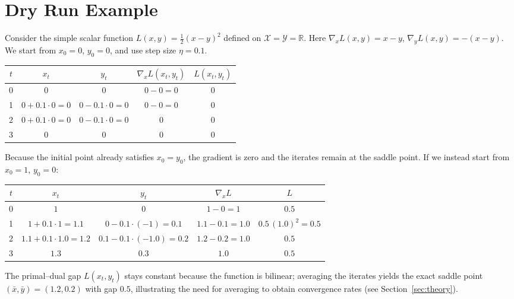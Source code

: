 \documentclass{article}
\begin{document}
\section*{Dry Run Example}
Consider the simple scalar function $L(x,y)=\tfrac12 (x-y)^{2}$ defined on $\mathcal{X}=\mathcal{Y}=\mathbb{R}$.  
Here $\nabla_{x}L(x,y)=x-y$, $\nabla_{y}L(x,y)=-(x-y)$.  
We start from $x_{0}=0$, $y_{0}=0$, and use step size $\eta=0.1$.

\begin{center}
\begin{tabular}{c|c|c|c|c}
$t$ & $x_{t}$ & $y_{t}$ & $\nabla_{x}L(x_{t},y_{t})$ & $L(x_{t},y_{t})$\\\hline
0 & $0$ & $0$ & $0-0=0$ & $0$\\
1 & $0+0.1\cdot0=0$ & $0-0.1\cdot0=0$ & $0-0=0$ & $0$\\
2 & $0+0.1\cdot0=0$ & $0-0.1\cdot0=0$ & $0$ & $0$\\
3 & $0$ & $0$ & $0$ & $0$
\end{tabular}
\end{center}
Because the initial point already satisfies $x_{0}=y_{0}$, the gradient is zero and the iterates remain at the saddle point.  
If we instead start from $x_{0}=1$, $y_{0}=0$:

\begin{center}
\begin{tabular}{c|c|c|c|c}
$t$ & $x_{t}$ & $y_{t}$ & $\nabla_{x}L$ & $L$ \\ \hline
0 & $1$ & $0$ & $1-0=1$ & $0.5$\\
1 & $1+0.1\cdot1=1.1$ & $0-0.1\cdot(-1)=0.1$ & $1.1-0.1=1.0$ & $0.5\,(1.0)^{2}=0.5$\\
2 & $1.1+0.1\cdot1.0=1.2$ & $0.1-0.1\cdot(-1.0)=0.2$ & $1.2-0.2=1.0$ & $0.5$\\
3 & $1.3$ & $0.3$ & $1.0$ & $0.5$
\end{tabular}
\end{center}
The primal–dual gap $L(x_{t},y_{t})$ stays constant because the function is bilinear; averaging the iterates yields the exact saddle point $(\bar x,\bar y)=(1.2,0.2)$ with gap $0.5$, illustrating the need for averaging to obtain convergence rates (see Section~\ref{sec:theory}).
\end{document}
